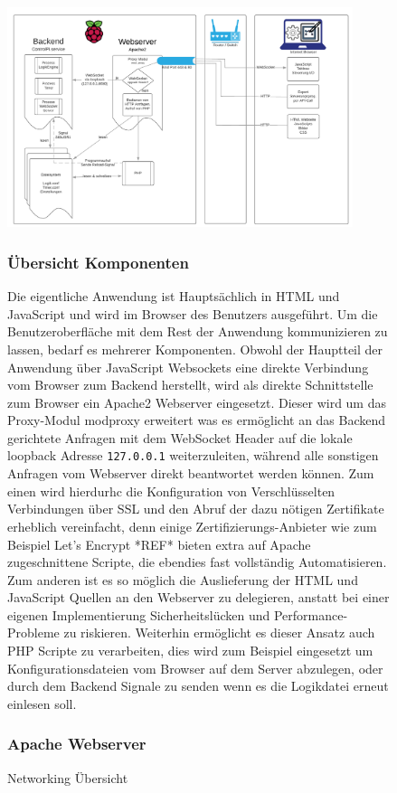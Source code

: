 \begin{figure}[H]
	\begin{center}
		\includegraphics[width=0.9\textwidth ,clip]{./images/BackendFrontend.pdf}
		\caption{Networking Übersicht}
		\label{img:externalNetworking}
	\end{center} 
\subsubsection{Übersicht Komponenten}
Die eigentliche Anwendung ist Hauptsächlich in HTML und JavaScript und wird im Browser des Benutzers ausgeführt. Um die Benutzeroberfläche mit dem Rest der Anwendung kommunizieren zu lassen, bedarf es mehrerer Komponenten. Obwohl der Hauptteil der Anwendung über JavaScript Websockets eine direkte Verbindung vom Browser zum Backend herstellt, wird als direkte Schnittstelle zum Browser ein Apache2 Webserver eingesetzt. Dieser wird um das Proxy-Modul modproxy erweitert was es ermöglicht an das Backend gerichtete Anfragen mit dem WebSocket Header auf die lokale loopback Adresse \texttt{127.0.0.1} weiterzuleiten, während alle sonstigen Anfragen vom Webserver direkt beantwortet werden können. Zum einen wird hierdurhc die Konfiguration von Verschlüsselten Verbindungen über SSL und den Abruf der dazu nötigen Zertifikate erheblich vereinfacht, denn einige Zertifizierungs-Anbieter wie zum Beispiel Let's Encrypt *REF* bieten extra auf Apache zugeschnittene Scripte, die ebendies fast vollständig Automatisieren. Zum anderen ist es so möglich die Auslieferung der HTML und JavaScript Quellen an den Webserver zu delegieren, anstatt bei einer eigenen Implementierung Sicherheitslücken und Performance-Probleme zu riskieren. Weiterhin ermöglicht es dieser Ansatz auch PHP Scripte zu verarbeiten, dies wird zum Beispiel eingesetzt um Konfigurationsdateien vom Browser auf dem Server abzulegen, oder durch dem Backend Signale zu senden wenn es die Logikdatei erneut einlesen soll.
\subsubsection{Apache Webserver}

\end{figure}
